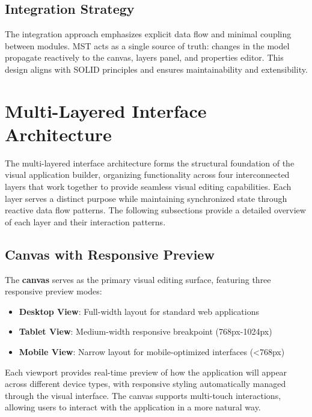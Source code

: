 \documentclass[oneside,12pt]{book}
\begin{document}
\subsection{Integration Strategy}

The integration approach emphasizes explicit data flow and minimal coupling between modules. MST acts as a single source of truth: changes in the model propagate reactively to the canvas, layers panel, and properties editor. This design aligns with SOLID principles and ensures maintainability and extensibility.



\section{Multi-Layered Interface Architecture}
\label{sec:interface-architecture}

The multi-layered interface architecture forms the structural foundation of the visual application builder, organizing functionality across four interconnected layers that work together to provide seamless visual editing capabilities. Each layer serves a distinct purpose while maintaining synchronized state through reactive data flow patterns. The following subsections provide a detailed overview of each layer and their interaction patterns.

\subsection{Canvas with Responsive Preview}

The \textbf{canvas} serves as the primary visual editing surface, featuring three responsive preview modes:

\begin{itemize}
    \item \textbf{Desktop View}: Full-width layout for standard web applications
    \item \textbf{Tablet View}: Medium-width responsive breakpoint (768px-1024px)
    \item \textbf{Mobile View}: Narrow layout for mobile-optimized interfaces (<768px)
\end{itemize}

Each viewport provides real-time preview of how the application will appear across different device types, with responsive styling automatically managed through the visual interface.
The canvas supports multi-touch interactions, allowing users to interact with the application in a more natural way. 
\end{document}
